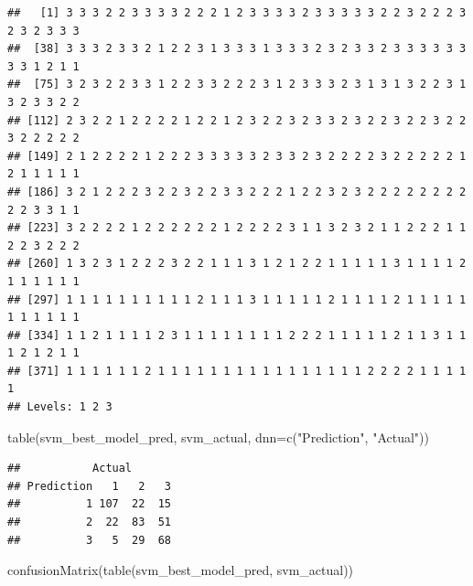 \documentclass[
]{article}
\newenvironment{Shaded}{\begin{snugshade}}{\end{snugshade}}
\newcommand{\AttributeTok}[1]{\textcolor[rgb]{0.77,0.63,0.00}{#1}}
\newcommand{\FunctionTok}[1]{\textcolor[rgb]{0.00,0.00,0.00}{#1}}
\newcommand{\NormalTok}[1]{#1}
\newcommand{\StringTok}[1]{\textcolor[rgb]{0.31,0.60,0.02}{#1}}
\begin{document}
\begin{verbatim}
##   [1] 3 3 3 2 2 3 3 3 3 2 2 2 1 2 3 3 3 3 2 3 3 3 3 3 2 2 3 2 2 2 3 2 3 2 3 3 3
##  [38] 3 3 3 2 3 3 2 1 2 2 3 1 3 3 3 1 3 3 3 2 3 2 3 3 2 3 3 3 3 3 3 3 3 1 2 1 1
##  [75] 3 2 3 2 2 3 3 1 2 2 3 3 2 2 2 3 1 2 3 3 3 2 3 1 3 1 3 2 2 3 1 3 2 3 3 2 2
## [112] 2 3 2 2 1 2 2 2 2 1 2 2 1 2 3 2 2 3 2 3 3 2 3 2 2 3 2 2 3 2 2 3 2 2 2 2 2
## [149] 2 1 2 2 2 2 1 2 2 2 3 3 3 3 3 2 3 3 2 3 2 2 2 2 3 2 2 2 2 2 1 2 1 1 1 1 1
## [186] 3 2 1 2 2 2 3 2 2 3 2 2 3 3 2 2 2 1 2 2 3 2 3 2 2 2 2 2 2 2 2 2 2 3 3 1 1
## [223] 3 2 2 2 2 1 2 2 2 2 2 2 1 2 2 2 2 3 1 1 3 2 3 2 1 1 2 2 2 1 1 2 2 3 2 2 2
## [260] 1 3 2 3 1 2 2 2 3 2 2 1 1 1 3 1 2 1 2 2 1 1 1 1 1 3 1 1 1 1 2 1 1 1 1 1 1
## [297] 1 1 1 1 1 1 1 1 1 1 2 1 1 1 3 1 1 1 1 1 2 1 1 1 1 2 1 1 1 1 1 1 1 1 1 1 1
## [334] 1 1 2 1 1 1 1 2 3 1 1 1 1 1 1 1 1 2 2 2 1 1 1 1 1 2 1 1 3 1 1 1 2 1 2 1 1
## [371] 1 1 1 1 1 1 2 1 1 1 1 1 1 1 1 1 1 1 1 1 1 1 1 2 2 2 2 1 1 1 1 1
## Levels: 1 2 3
\end{verbatim}

\begin{Shaded}
\begin{Highlighting}[]
\FunctionTok{table}\NormalTok{(svm\_best\_model\_pred, svm\_actual, }\AttributeTok{dnn=}\FunctionTok{c}\NormalTok{(}\StringTok{"Prediction"}\NormalTok{, }\StringTok{"Actual"}\NormalTok{))   }
\end{Highlighting}
\end{Shaded}

\begin{verbatim}
##           Actual
## Prediction   1   2   3
##          1 107  22  15
##          2  22  83  51
##          3   5  29  68
\end{verbatim}

\begin{Shaded}
\begin{Highlighting}[]
\FunctionTok{confusionMatrix}\NormalTok{(}\FunctionTok{table}\NormalTok{(svm\_best\_model\_pred, svm\_actual))}
\end{Highlighting}
\end{Shaded}
\end{document}
